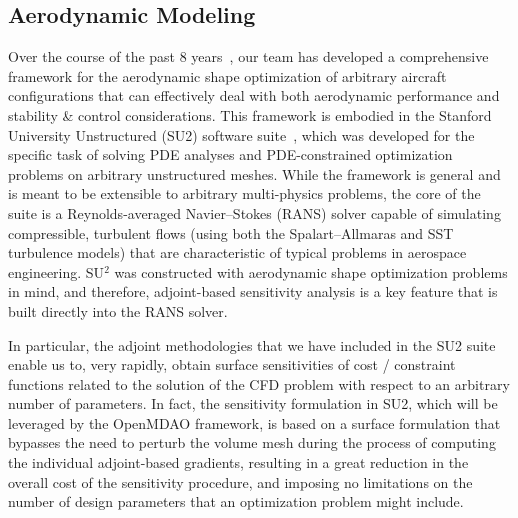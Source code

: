\documentclass[]{aiaa-tc}
\begin{document}
    \subsection{Aerodynamic Modeling}

\noindent Over the course of the past 8 years~\cite{Palacios:Adjoint-Based,Choi:2008qf}, our team has developed a comprehensive framework for the aerodynamic shape optimization of arbitrary aircraft configurations that can effectively deal with both aerodynamic performance and stability \& control considerations.  This framework is embodied in the Stanford University Unstructured (SU2) software suite~\cite{palacios2013}, which was developed for the specific task of solving PDE analyses and PDE-constrained optimization problems on arbitrary unstructured meshes. While the framework is general and is meant to be extensible to arbitrary multi-physics problems, the core of the suite is a Reynolds-averaged Navier--Stokes (RANS) solver capable of simulating compressible, turbulent flows (using both the Spalart--Allmaras and SST turbulence models) that are characteristic of typical problems in aerospace engineering. SU$^2$ was constructed with aerodynamic shape optimization problems in mind, and therefore, adjoint-based sensitivity analysis is a key feature that is built directly into the RANS solver.

In particular, the adjoint methodologies that we have included in the SU2 suite enable us to, very rapidly, obtain surface sensitivities of cost / constraint functions related to the solution of the CFD problem with respect to an arbitrary number of parameters.  In fact, the sensitivity formulation in SU2, which will be leveraged by the OpenMDAO framework, is based on a surface formulation that bypasses the need to perturb the volume mesh during the process of computing the individual adjoint-based gradients, resulting in a great reduction in the overall cost of the sensitivity procedure, and imposing no limitations on the number of design parameters that an optimization problem might include.
\end{document}
